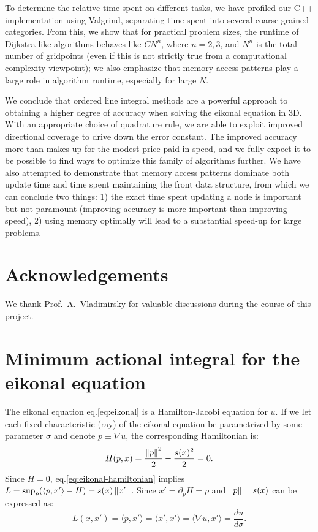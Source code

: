 \documentclass[smallcondensed]{svjour3}
\begin{document}
To determine the relative time spent on different tasks, we have
profiled our C++ implementation using Valgrind, separating time spent
into several coarse-grained categories. From this, we show that for
practical problem sizes, the runtime of Dijkstra-like algorithms
behaves like $C N^n$, where $n = 2, 3$, and $N^n$ is the total number
of gridpoints (even if this is not strictly true from a computational
complexity viewpoint); we also emphasize that memory access patterns
play a large role in algorithm runtime, especially for large $N$.

We conclude that ordered line integral methods are a powerful approach
to obtaining a higher degree of accuracy when solving the eikonal
equation in 3D. With an appropriate choice of quadrature rule, we are
able to exploit improved directional coverage to drive down the error
constant. The improved accuracy more than makes up for the modest
price paid in speed, and we fully expect it to be possible to find
ways to optimize this family of algorithms further. We have also
attempted to demonstrate that memory access patterns dominate both
update time and time spent maintaining the front data structure, from
which we can conclude two things: 1) the exact time spent updating a
node is important but not paramount (improving accuracy is more
important than improving speed), 2) using memory optimally will lead
to a substantial speed-up for large problems.

\section{Acknowledgements}

We thank Prof.\ A.\ Vladimirsky for valuable discussions during the
course of this project.

\appendix

\section[Minimum action integral]{Minimum actional integral for the
  eikonal equation}\label{sec:minimum-action-integral} The eikonal
equation eq.\@ \ref{eq:eikonal} is a Hamilton-Jacobi equation for
$u$. If we let each fixed characteristic (ray) of the eikonal equation
be parametrized by some parameter $\sigma$ and denote
$p \equiv \nabla u$, the corresponding Hamiltonian is:
\begin{equation}
  \label{eq:eikonal-hamiltonian}
  H{(p, x)} = \frac{\left\|p\right\|^2}{2} - \frac{s(x)^2}{2} = 0.
\end{equation}
Since $H = 0$, eq.\@ \ref{eq:eikonal-hamiltonian} implies
$L = \sup_p (\langle p, x' \rangle - H) = s(x) \left\|x'\right\|$. Since
$x' = \partial_p H = p$ and $\left\|p\right\| = s(x)$ can be expressed as:
\begin{equation}
  \label{eq:eikonal-lagrangian}
  L(x, x') = \langle p, x'\rangle = \langle x', x'\rangle = \langle \nabla u, x' \rangle = \frac{du}{d\sigma}.
\end{equation}
\end{document}
